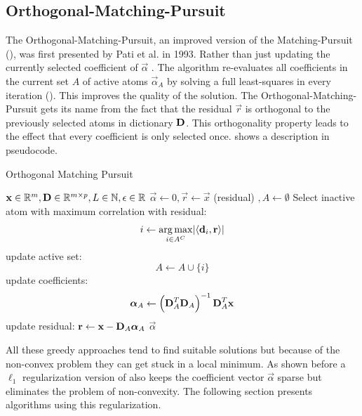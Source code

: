 \subsection{Orthogonal-Matching-Pursuit}
\label{sec:omp}
The Orthogonal-Matching-Pursuit, an improved version of
the Matching-Pursuit (), was first presented by Pati et al.
in 1993\cite{Pati1993}. Rather than just updating the currently selected
coefficient of $\vec{\alpha}$ . The algorithm
re-evaluates
all coefficients in the current set $A$ of active atoms $\vec{\alpha}_A$ by
solving a full least-squares in every iteration ().
This improves the quality of the solution\cite{Pati1993}. The
Orthogonal-Matching-Pursuit gets its name from the fact that the residual
$\vec{r}$ is orthogonal to the previously selected atoms in dictionary
$\boldsymbol{\mathrm{D}}$. This orthogonality property leads to the effect that every
coefficient is only selected once.  shows a
description in pseudocode.

\begin{algorithm}[h]
\caption{Orthogonal Matching Pursuit}
\label{alg:omp}
\begin{algorithmic}[1]
\REQUIRE $\boldsymbol{\mathrm{x}} \in \mathbb{R}^m, \boldsymbol{\mathrm{D}} \in \mathbb{R}^{m\times p}, L \in
\mathbb{N}, \epsilon \in \mathbb{R}$
\STATE $\vec{\alpha} \gets 0, \vec{r} \gets \vec{x} $ (residual) $, A \gets
\emptyset$
\STATE Select inactive atom with maximum correlation with residual: 
\begin{equation*}
i \gets \operatorname*{arg\,max}_{i \in A^C} \lvert \left<\boldsymbol{\mathrm{d}}_i,\boldsymbol{\mathrm{r}}\right> \rvert
\end{equation*}
\STATE update active set:
\begin{equation*}
 A \gets A \cup \{i\} 
\end{equation*}
\STATE update coefficients: 
\begin{align}
\boldsymbol{\mathrm{\alpha}}_A \gets \left( \boldsymbol{\mathrm{D}}_A^T \boldsymbol{\mathrm{D}}_A \right)^{-1}
\boldsymbol{\mathrm{D}}_A^T\boldsymbol{\mathrm{x}} 
\label{eq:omp_update}
\end{align}\label{alg:OMP_DTD}
\STATE update residual: $\boldsymbol{\mathrm{r}} \gets \boldsymbol{\mathrm{x}}-\boldsymbol{\mathrm{D}}_A\boldsymbol{\mathrm{\alpha}}_A$
\ENDFOR
\RETURN $\vec{\alpha}$
\end{algorithmic}
\end{algorithm}

All these greedy approaches tend to find suitable solutions but
because of the non-convex problem they can get stuck in a local minimum. As
shown before a $\ell_1$ regularization version of  also
keeps the coefficient vector $\vec{\alpha}$ sparse but eliminates the problem of
non-convexity. The following section presents algorithms using this
regularization.


